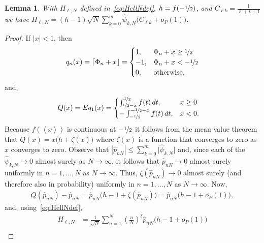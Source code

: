 \documentclass[aap]{imsart}
\newcommand{\fracpart}[1]{\left\langle #1 \right\rangle}
\newcommand{\abs}[1]{\left\vert #1 \right\vert}
\newcommand{\sabs}[1]{\vert #1 \vert}
\newcommand{\round}[1]{{\left\lceil #1 \right\rfloor}}
\newtheorem{lemma}{Lemma}
\begin{document}
\begin{lemma}\label{lem:sumpNhilb}
With $H_{\ell,N}$ defined in~\eqref{eq:HellNdef}, $h = f(-\nicefrac{1}{2})$, and  $C_{\ell k} = \tfrac{1}{\ell + k + 1}$ we have $H_{\ell,N} = (h-1)\sqrt{N} \sum_{k=0}^{m}  \widehat{\psi}_{k,N} \big(C_{\ell k} + o_P(1)\big)$.
\end{lemma}
\begin{proof}
If $\abs{x} < 1$, then
\[
q_n(x)  = \round{\Phi_n + x} = \begin{cases}
1, & \Phi_n + x  \geq \nicefrac{1}{2} \\
-1, & \Phi_n + x  < -\nicefrac{1}{2} \\
0, & \text{otherwise},
\end{cases}
\]
and,
\begin{align*}
Q(x) = Eq_1(x) &=  \begin{cases}
\int_{\nicefrac{1}{2} -x }^{\nicefrac{1}{2}}f(t)\,dt, &   x \geq 0 \\
-\int_{-\nicefrac{1}{2}}^{-\nicefrac{1}{2} - x }f(t)\,dt, &  x  < 0.
\end{cases} 
\end{align*}
Because $f(\fracpart{x})$ is continuous at $-\nicefrac{1}{2}$ it follows from the mean value theorem that $Q(x) = x \big( h + \zeta(x) \big)$
where $\zeta(x)$ is a function that converges to zero as $x$ converges to zero.  
Observe that $\abs{\widehat{p}_{nN}} \leq \sum_{k=0}^m\sabs{ \widehat{\psi}_{k,N}}$ and, since each of the $\widehat{\psi}_{k,N} \rightarrow 0$ almost surely as $N\rightarrow\infty$, it follows that $\widehat{p}_{nN} \rightarrow 0$ almost surely uniformly in $n = 1, \dots, N$ as $N\rightarrow\infty$.  Thus, $\zeta(\widehat{p}_{nN}) \rightarrow 0$ almost surely (and therefore also in probability) uniformly in $n = 1, \dots, N$ as $N\rightarrow\infty$.  Now,
\begin{align*}
Q(\widehat{p}_{nN}) - \widehat{p}_{nN} = \widehat{p}_{nN}\big( h - 1 + \zeta(\widehat{p}_{nN}) \big) = \widehat{p}_{nN}\big( h - 1 + o_P(1) \big), 
\end{align*}
and, using~\eqref{eq:HellNdef},
\begin{align*}
H_{\ell,N} &= \frac{1}{\sqrt{N}}\sum_{n=1}^{N}(\tfrac{n}{N})^\ell \widehat{p}_{nN}\big( h - 1 + o_P(1) \big)  \\

\end{align*}
\end{proof}
\end{document}

